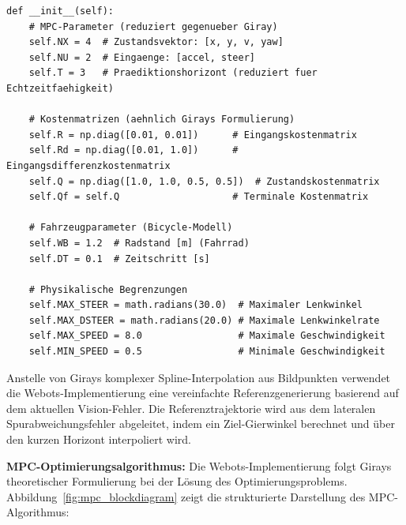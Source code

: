 \begin{lstlisting}[style=python,caption={MPC-Controller Initialisierung in der Webots-Implementierung},label={lst:webots_mpc_init}]
def __init__(self):
    # MPC-Parameter (reduziert gegenueber Giray)
    self.NX = 4  # Zustandsvektor: [x, y, v, yaw]
    self.NU = 2  # Eingaenge: [accel, steer]
    self.T = 3   # Praediktionshorizont (reduziert fuer Echtzeitfaehigkeit)
    
    # Kostenmatrizen (aehnlich Girays Formulierung)
    self.R = np.diag([0.01, 0.01])      # Eingangskostenmatrix
    self.Rd = np.diag([0.01, 1.0])      # Eingangsdifferenzkostenmatrix
    self.Q = np.diag([1.0, 1.0, 0.5, 0.5])  # Zustandskostenmatrix
    self.Qf = self.Q                    # Terminale Kostenmatrix
    
    # Fahrzeugparameter (Bicycle-Modell)
    self.WB = 1.2  # Radstand [m] (Fahrrad)
    self.DT = 0.1  # Zeitschritt [s]
    
    # Physikalische Begrenzungen
    self.MAX_STEER = math.radians(30.0)  # Maximaler Lenkwinkel
    self.MAX_DSTEER = math.radians(20.0) # Maximale Lenkwinkelrate
    self.MAX_SPEED = 8.0                 # Maximale Geschwindigkeit
    self.MIN_SPEED = 0.5                 # Minimale Geschwindigkeit
\end{lstlisting}

Anstelle von Girays komplexer Spline-Interpolation aus Bildpunkten verwendet die Webots-Implementierung eine vereinfachte 
Referenzgenerierung basierend auf dem aktuellen Vision-Fehler. Die Referenztrajektorie wird aus dem lateralen Spurabweichungsfehler 
abgeleitet, indem ein Ziel-Gierwinkel berechnet und über den kurzen Horizont interpoliert wird.

\textbf{MPC-Optimierungsalgorithmus:} Die Webots-Implementierung folgt Girays theoretischer Formulierung bei der Lösung des 
Optimierungsproblems. Abbildung~\ref{fig:mpc_blockdiagram} zeigt die strukturierte Darstellung des MPC-Algorithmus:

